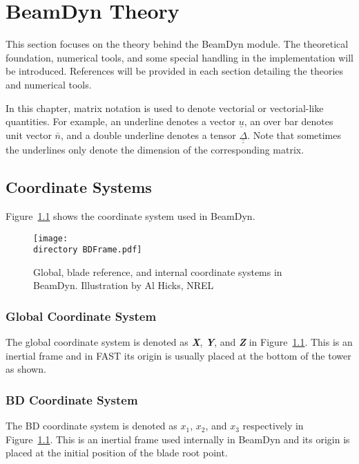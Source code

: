 \chapter{BeamDyn Theory}
\label{sec:Theory}

This section focuses on the theory behind the BeamDyn module. 
The theoretical foundation, numerical tools, and some special handling in the implementation will be introduced. References will be provided in each section detailing the theories and numerical tools.


In this chapter, matrix notation is used to denote vectorial or vectorial-like quantities. 
For example, an underline denotes a vector $\underline{u}$, an over bar denotes unit vector $\bar{n}$, and a double underline denotes a tensor $\underline{\underline{\Delta}}$. 
Note that sometimes the underlines only denote the dimension of the corresponding matrix.

\section{Coordinate Systems}
Figure~\ref{fig:BDFrame}  shows the coordinate system used in BeamDyn.
\begin{figure}[h!tp]
    \centering
    \texttt{[image: \\directory BDFrame.pdf]}
    \caption{Global, blade reference, and internal coordinate systems in BeamDyn. Illustration by Al Hicks, NREL}
    \label{fig:BDFrame}
\end{figure}

\subsection{Global Coordinate System}
The global coordinate system is denoted as \textbf{ {\it X}}, \textbf{ {\it Y}}, and \textbf{ {\it Z}} in Figure~\ref{fig:BDFrame}. 
This is an inertial frame and in FAST its origin is usually placed at the bottom of the tower as shown.

\subsection{BD Coordinate System}
The BD coordinate system is denoted as $x_1$, $x_2$, and $x_3$ respectively in Figure~\ref{fig:BDFrame}. 
This is an inertial frame used internally in BeamDyn and its origin is placed at the initial position of the blade root point.

